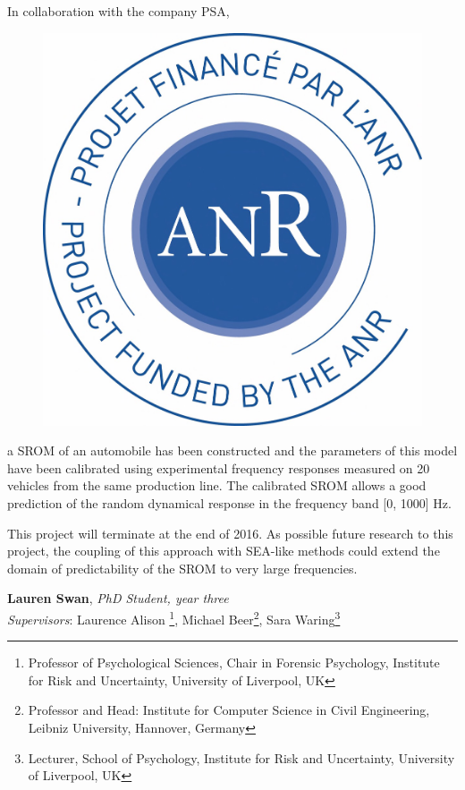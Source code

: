 \documentclass[11pt]{article}%
\begin{document}
\begin{minipage}[!t]{.75\linewidth}
\begin{multicols}{2}
In collaboration with the company PSA, 
\begin{figure}
\vspace{-10pt}
\includegraphics[width=0.16 \textwidth]{anas/logoLR.jpg}
\end{figure}
a SROM of an automobile has been constructed and the parameters of this model have been calibrated using experimental frequency responses measured on 20 vehicles from the same production line. The calibrated SROM allows a good prediction of the random dynamical response in the frequency band [0, 1000] Hz.
%

This project will terminate at the end of 2016. As possible future research to this project, the coupling of this approach with SEA-like methods could extend the domain of predictability of the  SROM to very large frequencies.
\end{multicols}
\end{minipage}

















\cleardoublepage

\thispagestyle{studentProjects}

\begin{minipage}[t]{.99\linewidth} %
\hypertarget{Lauren}{}
\end{minipage}


{\bf Lauren Swan}, \textit{PhD Student, year three}\\
\textit{Supervisors}: Laurence Alison \footnote{Professor of Psychological Sciences, Chair in Forensic Psychology, Institute for Risk and Uncertainty, University of Liverpool, UK}, Michael Beer\footnote{Professor and Head: Institute for Computer Science in Civil Engineering, Leibniz University, Hannover, Germany}, Sara Waring\footnote{Lecturer, School of Psychology, Institute for Risk and Uncertainty, University of Liverpool, UK}\\
\end{document}
